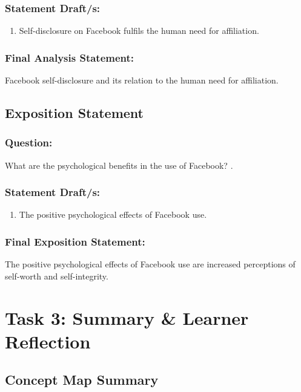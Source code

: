 \documentclass[12pt,a4paper]{report}
\begin{document}
\subsubsection*{\textsf{Statement Draft/s:}}
\begin{enumerate}
\item Self-disclosure on Facebook fulfils the human need for affiliation.
\end{enumerate}

\subsubsection*{\textsf{Final Analysis Statement:}}
Facebook self-disclosure and its relation to the human need for affiliation.

\subsection*{\textsf{Exposition Statement}}

\subsubsection*{\textsf{Question:}}
What are the psychological benefits in the use of Facebook? \citep{Toma2013}.

\subsubsection*{\textsf{Statement Draft/s:}}
\begin{enumerate}
\item The positive psychological effects of Facebook use.
\end{enumerate}

\subsubsection*{\textsf{Final Exposition Statement:}}
The positive psychological effects of Facebook use are increased perceptions of self-worth and self-integrity.

\newpage
\section*{\textsf{Task 3: Summary \& Learner Reflection}}

\subsection*{\textsf{Concept Map Summary}}
\end{document}
